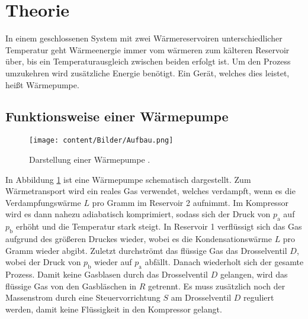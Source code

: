 
\section{Theorie}
\label{sec:Theorie}
In einem geschlossenen System mit zwei Wärmereservoiren unterschiedlicher Temperatur geht
  Wärmeenergie immer vom wärmeren zum kälteren Reservoir über, bis ein
  Temperaturausgleich zwischen beiden erfolgt ist. Um den Prozess
  umzukehren wird zusätzliche Energie benötigt. Ein Gerät, welches dies leistet,
  heißt Wärmepumpe.
 \subsection{Funktionsweise einer Wärmepumpe}
  \begin{figure}
  	\centering
  	\texttt{[image: content/Bilder/Aufbau.png]}
  	\caption{Darstellung einer Wärmepumpe \cite{V206}.}
  	\label{fig:Aufbau1}
  \end{figure}
In Abbildung \ref{fig:Aufbau1} ist eine Wärmepumpe schematisch dargestellt.
Zum Wärmetransport wird ein reales Gas verwendet, welches verdampft,
wenn es die Verdampfungswärme $L$ pro Gramm im Reservoir 2 aufnimmt. Im Kompressor wird es dann nahezu adiabatisch komprimiert, sodass sich der Druck von $p_\text{a}$ auf $p_\text{b}$ erhöht und die Temperatur stark steigt. In Reservoir 1 verflüssigt sich das Gas aufgrund des größeren Druckes wieder, wobei es die Kondensationswärme $L$ pro Gramm wieder abgibt. Zuletzt durchströmt das flüssige Gas das Drosselventil $D$, wobei der Druck von $p_\text{b}$ wieder auf $p_\text{a}$ abfällt. Danach wiederholt sich der gesamte Prozess. Damit keine Gasblasen durch das Drosselventil $D$ gelangen, wird das flüssige Gas von den Gasbläschen in $R$ getrennt. Es muss zusätzlich noch der Massenstrom durch eine Steuervorrichtung $S$ am Drosselventil $D$ reguliert werden, damit keine Flüssigkeit in den Kompressor gelangt.

